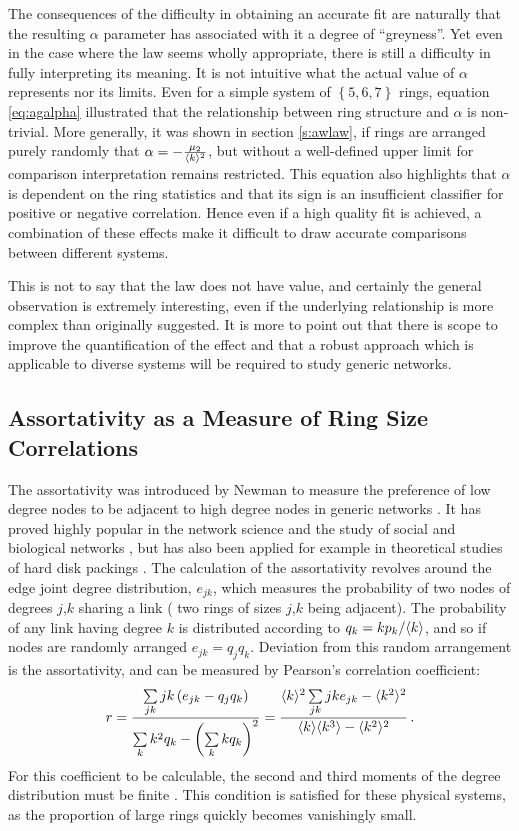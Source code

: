 The consequences of the difficulty in obtaining an accurate \aw{} fit are naturally that the resulting $\alpha$ parameter has associated with it a degree of ``greyness''.
Yet even in the case where the \aw{} law seems wholly appropriate, there is still a difficulty in fully interpreting its meaning.
It is not intuitive what the actual value of $\alpha$ represents nor its limits.
Even for a simple system of $\left\{5,6,7\right\}$ rings, equation \eqref{eq:agalpha} illustrated that the relationship between ring structure and $\alpha$ is non\--trivial.
More generally, it was shown in section \ref{s:awlaw}, if rings are arranged purely randomly that $\alpha=-\frac{\mu_2}{\langle k \rangle^2}$, but without a well\--defined upper limit for comparison interpretation remains restricted.
This equation also highlights that $\alpha$ is dependent on the ring statistics and that its sign is an insufficient classifier for positive or negative correlation.
Hence even if a high quality fit is achieved, a combination of these effects make it difficult to draw accurate comparisons between different systems.

This is not to say that the \aw{} law does not have value, and certainly the general observation is extremely interesting, even if the underlying relationship is more complex than originally suggested.
It is more to point out that there is scope to improve the quantification of the effect and that a robust approach which is applicable to diverse systems will be required to study generic \td{} networks.

\subsection{Assortativity as a Measure of Ring Size Correlations}
\label{s:assortativity}

The assortativity was introduced by Newman to measure the preference of low degree nodes to be adjacent to high degree nodes in generic networks \cite{Newman2002}.
It has proved highly popular in the network science and the study of social and biological networks \cite{Noldus2015}, but has also been applied for example in theoretical studies of hard disk packings \cite{Chremos2007}.
The calculation of the assortativity revolves around the edge joint degree distribution, $e_{jk}$, which measures the probability of two nodes of degrees $j$,$k$ sharing a link (\ie{} two rings of sizes $j$,$k$ being adjacent).
The probability of any link having degree $k$ is distributed according to $q_k=kp_k/\langle k \rangle$, and so if nodes are randomly arranged $e_{jk}=q_j q_k$.
Deviation from this random arrangement is the assortativity, and can be measured by Pearson's correlation coefficient:
\begin{equation}
        \label{eq:assortativity}
        r = \frac{\sum\limits_{jk} jk\left(e_{jk}-q_jq_k\right)}{\sum\limits_k k^2q_k - \left(\sum\limits_k kq_k\right)^2}=\frac{\langle k \rangle^2\sum\limits_{jk} jke_{jk}-\langle k^2 \rangle^2}{\langle k \rangle\langle k^3 \rangle-\langle k^2 \rangle^2}\,.
\end{equation}
For this coefficient to be calculable, the second and third moments of the degree distribution must be finite \cite{Litvak2013}.
This condition is satisfied for these physical systems, as the proportion of large rings quickly becomes vanishingly small.

